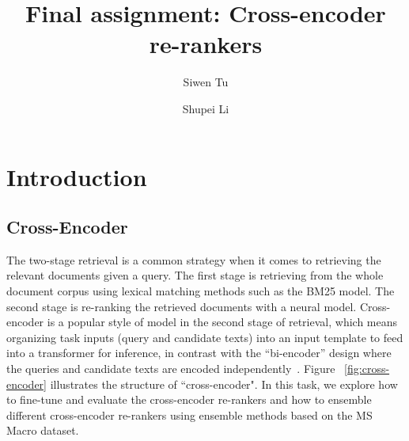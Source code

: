 \documentclass[acmsmall]{acmart}
\begin{document}
\title{Final assignment: Cross-encoder re-rankers}

\author{Siwen Tu}
\author{Shupei Li}

\renewcommand{\shortauthors}{S. Tu and S. Li}




\maketitle

\section{Introduction}
\subsection{Cross-Encoder}
The two-stage retrieval is a common strategy when it comes to retrieving the relevant documents given a query. The first stage is retrieving from the whole document corpus using lexical matching methods such as the BM25 model. The second stage is re-ranking the retrieved documents with a neural model. Cross-encoder is a popular style of model in the second stage of retrieval, which means organizing task inputs (query and candidate texts) into an input template to feed into a transformer for inference, in contrast with the ``bi-encoder'' design where the queries and candidate texts are encoded independently~\cite{lin2020pretrained}. Figure ~\ref{fig:cross-encoder} illustrates the structure of ``cross-encoder". In this task, we explore how to fine-tune and evaluate the cross-encoder re-rankers and how to ensemble different cross-encoder re-rankers using ensemble methods based on the MS Macro dataset. 
\end{document}

